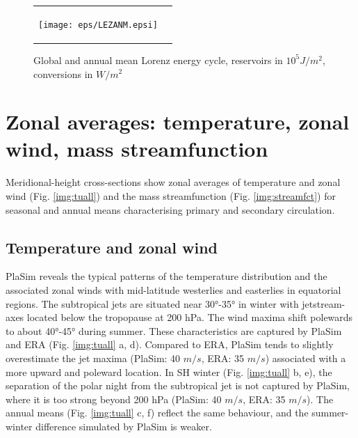 \documentclass[12pt,a4paper,twoside,openright,headinclude,liststotoc,bibtotoc]{scrreprt}
\begin{document}
\begin{figure}[c]
\begin{tabular}{cc}
\begin{minipage}{1.0\textwidth}
\begin{center}
\texttt{[image: eps/LEZANM.epsi]}
\end{center}
\end{minipage}
\end{tabular}
\vspace{-5.2cm}\caption[Global and annual mean Lorenz energy cycle]{Global and annual mean Lorenz energy cycle, reservoirs in $10^{5}J/m^{2}$, conversions in $W/m^{2}$}
\label{img:lez}
\end{figure}

\vspace{-0.4cm}
\chapter{Zonal averages: temperature, zonal wind, mass streamfunction}
\vspace{-0.4cm}
Meridional-height cross-sections show zonal averages of temperature and zonal wind (Fig. \ref{img:tuall}) and the mass streamfunction (Fig. \ref{img:streamfct}) for seasonal and annual means characterising primary and secondary circulation.

\vspace{-0.4cm}
\section{Temperature and zonal wind}
\vspace{-0.4cm}

PlaSim reveals the typical patterns of the temperature distribution and the associated zonal winds with mid-latitude westerlies and easterlies in equatorial regions. The subtropical jets are situated near 30°-35° in winter with jetstream-axes located below the tropopause at 200 hPa. The wind maxima shift polewards to about 40°-45° during summer. These characteristics are captured by PlaSim and ERA (Fig. \ref{img:tuall} a, d). Compared to ERA, PlaSim tends to slightly overestimate the jet maxima (PlaSim: 40 $m/s$, ERA: 35 $m/s$) associated with a more upward and poleward location. In SH winter (Fig. \ref{img:tuall} b, e), the separation of the polar night from the subtropical jet is not captured by PlaSim, where it is too strong beyond 200 hPa (PlaSim: 40 $m/s$, ERA: 35 $m/s$). The annual means (Fig. \ref{img:tuall} c, f) reflect the same behaviour, and the summer-winter difference simulated by PlaSim is weaker.
\end{document}
